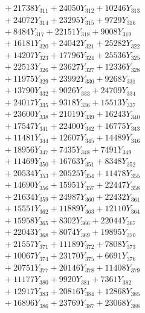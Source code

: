 \documentclass[a4paper,10pt]{article}
\begin{document}
{\begin{align}
&\;  + 21738 Y_{311} + 24050 Y_{312} + 10246 Y_{313} \\[0.3ex]
&\;  + 24072 Y_{314} + 23295 Y_{315} + 9729 Y_{316} \\[0.3ex]
&\;  + 8484 Y_{317} + 22151 Y_{318} + 9008 Y_{319} \\[0.3ex]
&\;  + 16181 Y_{320} + 24042 Y_{321} + 25282 Y_{322} \\[0.3ex]
&\;  + 14207 Y_{323} + 17796 Y_{324} + 25536 Y_{325} \\[0.3ex]
&\;  + 22513 Y_{326} + 23627 Y_{327} + 12336 Y_{328} \\[0.5ex]\allowbreak
&\;  + 11975 Y_{329} + 23992 Y_{330} + 9268 Y_{331} \\[0.3ex]
&\;  + 13790 Y_{332} + 9026 Y_{333} + 24709 Y_{334} \\[0.3ex]
&\;  + 24017 Y_{335} + 9318 Y_{336} + 15513 Y_{337} \\[0.3ex]
&\;  + 23600 Y_{338} + 21019 Y_{339} + 16243 Y_{340} \\[0.3ex]
&\;  + 17547 Y_{341} + 22400 Y_{342} + 16775 Y_{343} \\[0.3ex]
&\;  + 11481 Y_{344} + 12607 Y_{345} + 14489 Y_{346} \\[0.3ex]
&\;  + 18956 Y_{347} + 7435 Y_{348} + 7491 Y_{349} \\[0.3ex]
&\;  + 11469 Y_{350} + 16763 Y_{351} + 8348 Y_{352} \\[0.3ex]
&\;  + 20534 Y_{353} + 20525 Y_{354} + 11478 Y_{355} \\[0.3ex]
&\;  + 14690 Y_{356} + 15951 Y_{357} + 22447 Y_{358} \\[0.5ex]\allowbreak
&\;  + 21634 Y_{359} + 24987 Y_{360} + 22432 Y_{361} \\[0.3ex]
&\;  + 15551 Y_{362} + 11889 Y_{363} + 12110 Y_{364} \\[0.3ex]
&\;  + 15958 Y_{365} + 8302 Y_{366} + 22044 Y_{367} \\[0.3ex]
&\;  + 22043 Y_{368} + 8074 Y_{369} + 19895 Y_{370} \\[0.3ex]
&\;  + 21557 Y_{371} + 11189 Y_{372} + 7808 Y_{373} \\[0.3ex]
&\;  + 10067 Y_{374} + 23170 Y_{375} + 6691 Y_{376} \\[0.3ex]
&\;  + 20751 Y_{377} + 20146 Y_{378} + 11408 Y_{379} \\[0.3ex]
&\;  + 11177 Y_{380} + 9920 Y_{381} + 7361 Y_{382} \\[0.3ex]
&\;  + 12917 Y_{383} + 20816 Y_{384} + 12868 Y_{385} \\[0.3ex]
&\;  + 16896 Y_{386} + 23769 Y_{387} + 23068 Y_{388} \\[0.5ex]\allowbreak

\end{align}}
\end{document}
